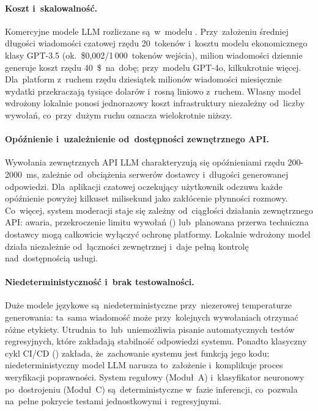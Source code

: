 \paragraph{Koszt i~skalowalność.}
Komercyjne modele LLM rozliczane są~w~modelu .
Przy~założeniu średniej długości wiadomości czatowej rzędu 20~tokenów
i~kosztu modelu ekonomicznego klasy GPT-3.5 (ok.~\$0{,}002/1\,000~tokenów
wejścia), milion wiadomości dziennie generuje koszt rzędu 40~\$~na~dobę;
przy~modelu GPT-4o, kilkukrotnie więcej. Dla~platform z~ruchem
rzędu dziesiątek milionów wiadomości miesięcznie wydatki przekraczają
tysiące dolarów i~rosną liniowo z~ruchem. Własny model wdrożony lokalnie
ponosi jednorazowy koszt infrastruktury niezależny od~liczby wywołań,
co~przy~dużym ruchu oznacza wielokrotnie niższy.

\paragraph{Opóźnienie i~uzależnienie od~dostępności zewnętrznego API.}
Wywołania zewnętrznych API LLM charakteryzują się opóźnieniami rzędu
200-2000~ms, zależnie od~obciążenia serwerów dostawcy i~długości
generowanej odpowiedzi. Dla~aplikacji czatowej oczekujący użytkownik
odczuwa każde opóźnienie powyżej kilkuset milisekund jako zakłócenie
płynności rozmowy. Co~więcej, system moderacji staje się zależny od~ciągłości
działania zewnętrznego API: awaria, przekroczenie limitu wywołań
() lub~planowana przerwa techniczna dostawcy
mogą całkowicie wyłączyć ochronę platformy. Lokalnie wdrożony model
działa niezależnie od~łączności zewnętrznej i~daje pełną kontrolę
nad~dostępnością usługi.

\paragraph{Niedeterministyczność i~brak testowalności.}
Duże modele językowe są~niedeterministyczne przy~niezerowej temperaturze
generowania: ta~sama wiadomość może przy~kolejnych wywołaniach otrzymać
różne etykiety. Utrudnia to~lub~uniemożliwia pisanie automatycznych testów
regresyjnych, które zakładają stabilność odpowiedzi systemu. Ponadto
klasyczny cykl CI/CD ()
zakłada, że~zachowanie systemu jest funkcją jego kodu; niedeterministyczny
model LLM narusza to~założenie i~komplikuje proces weryfikacji poprawności.
System regułowy (Moduł~A) i~klasyfikator neuronowy po~dostrojeniu (Moduł~C)
są~deterministyczne w~fazie inferencji, co~pozwala na~pełne pokrycie testami
jednostkowymi i~regresyjnymi.

